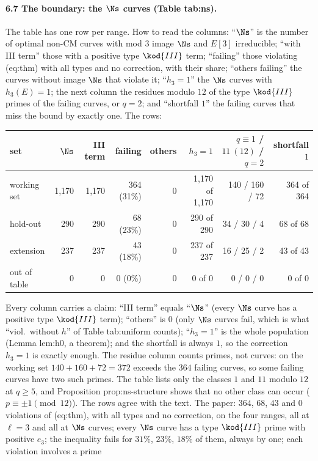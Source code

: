 \begin{sloppypar}
\paragraph{6.7 The boundary: the $\Ns$ curves (Table tab:ns).} The table has one row per range. How to read the columns: ``$\Ns$'' is the number of optimal
non-CM curves with mod $3$ image $\Ns$ and $E[3]$ irreducible; ``with III term'' those with a positive type $\kod{III}$ term; ``failing'' those violating (eq:thm) with all types
and no correction, with their share; ``others failing'' the curves without image $\Ns$ that violate it; ``$h_3=1$'' the $\Ns$ curves with $h_3(E)=1$; the next column the
residues modulo $12$ of the type $\kod{III}$ primes of the failing curves, or $q=2$; and ``shortfall $1$'' the failing curves that miss the bound by exactly one. The rows:
\begin{center}\footnotesize
\begin{tabular}{lrrrrrrr}
\toprule
set & $\Ns$ & III term & failing & others & $h_3=1$ & $q\equiv1$ / $11\ (12)$ / $q=2$ & shortfall $1$\\
\midrule
working set & 1,170 & 1,170 & 364 (31\%) & 0 & 1,170 of 1,170 & 140 / 160 / 72 & 364 of 364\\
hold-out & 290 & 290 & 68 (23\%) & 0 & 290 of 290 & 34 / 30 / 4 & 68 of 68\\
extension & 237 & 237 & 43 (18\%) & 0 & 237 of 237 & 16 / 25 / 2 & 43 of 43\\
out of table & 0 & 0 & 0 (0\%) & 0 & 0 of 0 & 0 / 0 / 0 & 0 of 0\\
\bottomrule
\end{tabular}
\end{center}
Every column carries a claim: ``III term'' equals ``$\Ns$'' (every $\Ns$ curve has a positive type $\kod{III}$ term); ``others'' is $0$ (only $\Ns$ curves fail, which is what
``viol.\ without $h$'' of Table tab:uniform counts); ``$h_3=1$'' is the whole population (Lemma lem:h0, a theorem); and the shortfall is always $1$, so the correction
$h_3=1$ is exactly enough. The residue column counts primes, not curves: on the working set $140+160+72=372$ exceeds the $364$ failing curves, so some failing
curves have two such primes. The table lists only the classes $1$ and $11$ modulo $12$ at $q\ge5$, and Proposition prop:ns-structure shows that no other class can occur ($p\equiv\pm1\pmod{12}$).
The rows agree with the text. The paper: $364$, $68$, $43$ and $0$ violations of (eq:thm), with all types and no correction, on the four ranges, all at $\ell=3$ and
all at $\Ns$ curves; every $\Ns$ curve has a type $\kod{III}$ prime with positive $e_3$; the inequality fails for $31\%$, $23\%$, $18\%$ of them, always by one; each violation involves a prime

\end{sloppypar}
